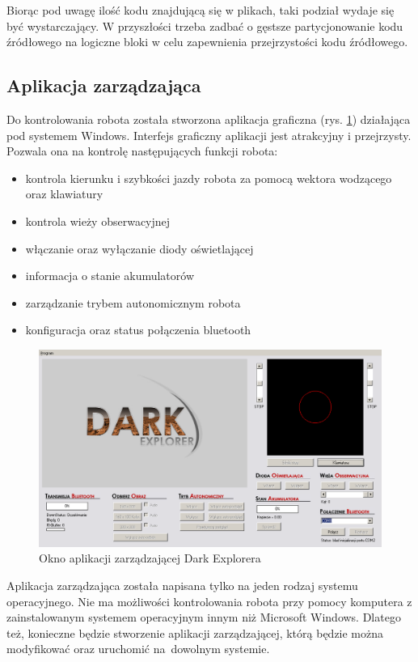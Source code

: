 Biorąc pod uwagę ilość kodu znajdującą się w plikach, taki podział wydaje się być
wystarczający. W przyszłości trzeba zadbać o gęstsze partycjonowanie kodu
źródłowego na logiczne bloki w celu zapewnienia przejrzystości kodu źródłowego.

\subsection{Aplikacja zarządzająca}
Do kontrolowania robota została stworzona aplikacja graficzna (rys.
\ref{fig:AplikacjaZarz}) działająca pod systemem Windows. Interfejs graficzny
aplikacji jest atrakcyjny i przejrzysty. Pozwala ona na kontrolę następujących funkcji robota:
\begin{itemize}
\setlength{\parsep}{2pt}
\setlength{\itemsep}{2mm}
\setlength{\parskip}{4pt}
 \item kontrola kierunku i szybkości jazdy robota za pomocą wektora wodzącego oraz klawiatury
 \item kontrola wieży obserwacyjnej
 \item włączanie oraz wyłączanie diody oświetlającej
 \item informacja o stanie akumulatorów
 \item zarządzanie trybem autonomicznym robota
 \item konfiguracja oraz status połączenia bluetooth
\end{itemize}

\begin{figure}[!ht]
 \centering
 \includegraphics[width=\textwidth]{../images/ch02/decontrollprogram.png}
 \caption{Okno aplikacji zarządzającej Dark Explorera}
 \label{fig:AplikacjaZarz}
\end{figure}

Aplikacja zarządzająca została napisana tylko na jeden rodzaj systemu
operacyjnego. Nie ma możliwości kontrolowania robota przy pomocy komputera z
zainstalowanym systemem operacyjnym innym niż Microsoft Windows. Dlatego też,
konieczne będzie stworzenie aplikacji zarządzającej, którą będzie można
modyfikować oraz uruchomić na~dowolnym systemie.


